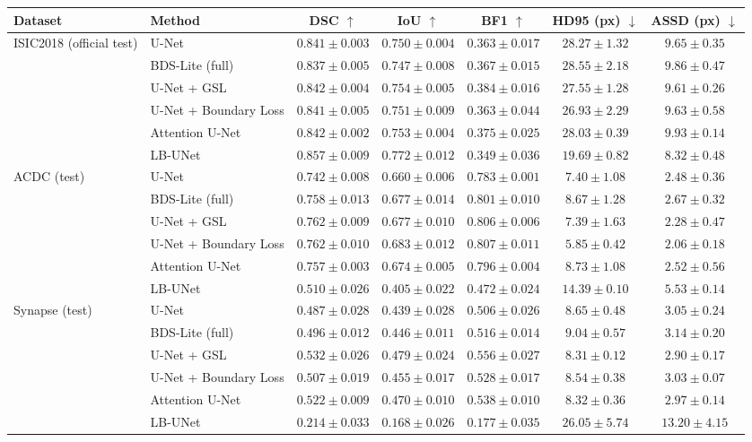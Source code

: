 \begin{tabular}{llccccc}
\toprule
Dataset & Method & DSC $\uparrow$ & IoU $\uparrow$ & BF1 $\uparrow$ & HD95 (px) $\downarrow$ & ASSD (px) $\downarrow$ \\
\midrule
ISIC2018 (official test) & U-Net & $0.841 \pm 0.003$ & $0.750 \pm 0.004$ & $0.363 \pm 0.017$ & $28.27 \pm 1.32$ & $9.65 \pm 0.35$ \\
 & BDS-Lite (full) & $0.837 \pm 0.005$ & $0.747 \pm 0.008$ & $0.367 \pm 0.015$ & $28.55 \pm 2.18$ & $9.86 \pm 0.47$ \\
 & U-Net + GSL & $0.842 \pm 0.004$ & $0.754 \pm 0.005$ & $0.384 \pm 0.016$ & $27.55 \pm 1.28$ & $9.61 \pm 0.26$ \\
 & U-Net + Boundary Loss & $0.841 \pm 0.005$ & $0.751 \pm 0.009$ & $0.363 \pm 0.044$ & $26.93 \pm 2.29$ & $9.63 \pm 0.58$ \\
 & Attention U-Net & $0.842 \pm 0.002$ & $0.753 \pm 0.004$ & $0.375 \pm 0.025$ & $28.03 \pm 0.39$ & $9.93 \pm 0.14$ \\
 & LB-UNet & $0.857 \pm 0.009$ & $0.772 \pm 0.012$ & $0.349 \pm 0.036$ & $19.69 \pm 0.82$ & $8.32 \pm 0.48$ \\
\midrule
ACDC (test) & U-Net & $0.742 \pm 0.008$ & $0.660 \pm 0.006$ & $0.783 \pm 0.001$ & $7.40 \pm 1.08$ & $2.48 \pm 0.36$ \\
 & BDS-Lite (full) & $0.758 \pm 0.013$ & $0.677 \pm 0.014$ & $0.801 \pm 0.010$ & $8.67 \pm 1.28$ & $2.67 \pm 0.32$ \\
 & U-Net + GSL & $0.762 \pm 0.009$ & $0.677 \pm 0.010$ & $0.806 \pm 0.006$ & $7.39 \pm 1.63$ & $2.28 \pm 0.47$ \\
 & U-Net + Boundary Loss & $0.762 \pm 0.010$ & $0.683 \pm 0.012$ & $0.807 \pm 0.011$ & $5.85 \pm 0.42$ & $2.06 \pm 0.18$ \\
 & Attention U-Net & $0.757 \pm 0.003$ & $0.674 \pm 0.005$ & $0.796 \pm 0.004$ & $8.73 \pm 1.08$ & $2.52 \pm 0.56$ \\
 & LB-UNet & $0.510 \pm 0.026$ & $0.405 \pm 0.022$ & $0.472 \pm 0.024$ & $14.39 \pm 0.10$ & $5.53 \pm 0.14$ \\
\midrule
Synapse (test) & U-Net & $0.487 \pm 0.028$ & $0.439 \pm 0.028$ & $0.506 \pm 0.026$ & $8.65 \pm 0.48$ & $3.05 \pm 0.24$ \\
 & BDS-Lite (full) & $0.496 \pm 0.012$ & $0.446 \pm 0.011$ & $0.516 \pm 0.014$ & $9.04 \pm 0.57$ & $3.14 \pm 0.20$ \\
 & U-Net + GSL & $0.532 \pm 0.026$ & $0.479 \pm 0.024$ & $0.556 \pm 0.027$ & $8.31 \pm 0.12$ & $2.90 \pm 0.17$ \\
 & U-Net + Boundary Loss & $0.507 \pm 0.019$ & $0.455 \pm 0.017$ & $0.528 \pm 0.017$ & $8.54 \pm 0.38$ & $3.03 \pm 0.07$ \\
 & Attention U-Net & $0.522 \pm 0.009$ & $0.470 \pm 0.010$ & $0.538 \pm 0.010$ & $8.32 \pm 0.36$ & $2.97 \pm 0.14$ \\
 & LB-UNet & $0.214 \pm 0.033$ & $0.168 \pm 0.026$ & $0.177 \pm 0.035$ & $26.05 \pm 5.74$ & $13.20 \pm 4.15$ \\
\bottomrule
\end{tabular}

